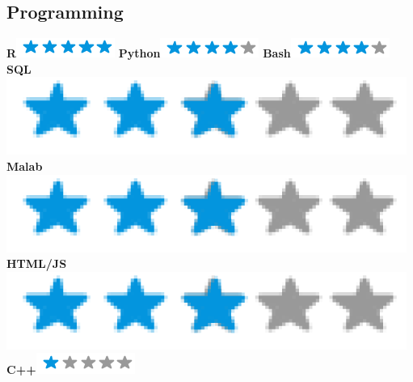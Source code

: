 \documentclass[]{friggeri-cv}
\begin{document}
\begin{aside}
  \section{Programming}
    \textbf{R}\includegraphics[scale=0.40]{img/5stars.png}
    \textbf{Python}\includegraphics[scale=0.40]{img/4stars.png}
    \textbf{Bash}\includegraphics[scale=0.40]{img/4stars.png}
    \textbf{SQL}\includegraphics[scale=0.40]{img/3stars.png}
    \textbf{Malab}\includegraphics[scale=0.40]{img/3stars.png}
    \textbf{HTML/JS}\includegraphics[scale=0.40]{img/3stars.png}
    \textbf{C++}\includegraphics[scale=0.40]{img/1stars.png}
    ~

\end{aside}
\end{document}
